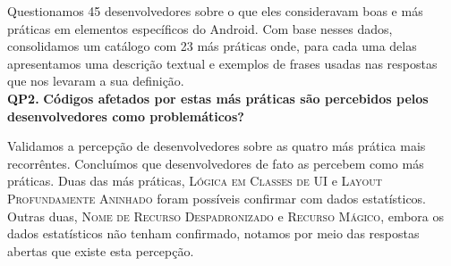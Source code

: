 Questionamos 45 desenvolvedores sobre o que eles consideravam boas e más práticas em elementos específicos do Android. Com base nesses dados, consolidamos um catálogo com 23 más práticas onde, para cada uma delas apresentamos uma descrição textual e exemplos de frases usadas nas respostas que nos levaram a sua definição. \\

\textbf{QP2.} \textbf{Códigos afetados por estas más práticas são percebidos pelos desenvolvedores como problemáticos?}

Validamos a percepção de desenvolvedores sobre as quatro más prática mais recorrêntes. Concluímos que desenvolvedores de fato as percebem como más práticas. Duas das más práticas, \textsc{Lógica em Classes de UI} e \textsc{Layout Profundamente Aninhado} foram possíveis confirmar com dados estatísticos. Outras duas, \textsc{Nome de Recurso Despadronizado} e \textsc{Recurso Mágico}, embora os dados estatísticos não tenham confirmado, notamos por meio das respostas abertas que existe esta percepção.



